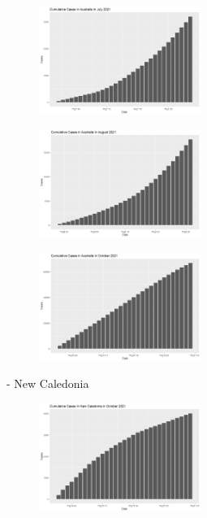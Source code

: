\documentclass[a4paper]{article}
\theoremstyle{definition}
\begin{document}
\begin{enumerate}[i)]
\begin{enumerate}[1)]
		\begin{figure} [!htp]
  		\centering
  		\includegraphics [width=0.47\textwidth] {Images/aus_cases_4}
		\end{figure}
		
		\begin{figure} [!htp]
  		\centering
  		\includegraphics [width=0.47\textwidth] {Images/aus_cases_6}
		\end{figure}
		
		\begin{figure} [!htp]
  		\centering
  		\includegraphics [width=0.47\textwidth] {Images/aus_cases_8}
		\end{figure}
	- New Caledonia\\
		\begin{figure} [!htp]
  		\centering
  		\includegraphics [width=0.47\textwidth] {Images/cal_cases_2}
		\end{figure}
		

\end{enumerate}
\end{enumerate}
\end{document}
